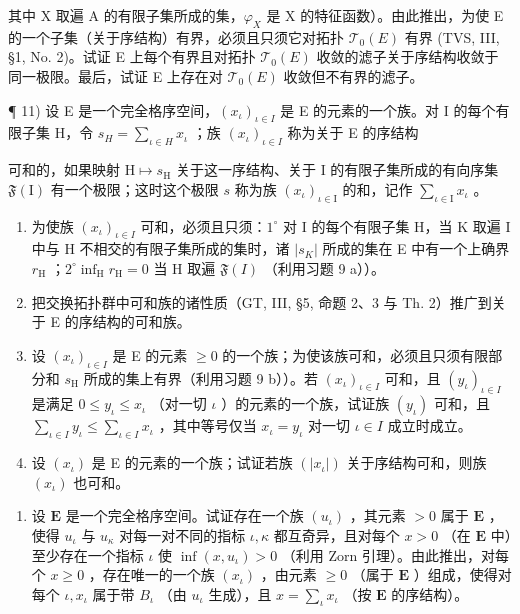 其中 X 取遍 A 的有限子集所成的集，\(\varphi_{X}\) 是 X 的特征函数）。由此推出，为使 E 的一个子集（关于序结构）有界，必须且只须它对拓扑 \(\mathcal{T}_{0}(E)\) 有界 (TVS, III, §1, No. 2)。试证 E 上每个有界且对拓扑 \(\mathcal{T}_{0}(E)\) 收敛的滤子关于序结构收敛于同一极限。最后，试证 E 上存在对 \(\mathcal{T}_{0}(E)\) 收敛但不有界的滤子。

¶ 11) 设 E 是一个完全格序空间，\((x_{\iota})_{\iota \in I}\) 是 E 的元素的一个族。对 I 的每个有限子集 H，令 \(s_{H} = \sum_{\iota \in H} x_{\iota}\) ；族 \((x_{\iota})_{\iota \in I}\) 称为关于 E 的序结构

可和的，如果映射 \(\mathrm{H} \mapsto s_{\mathrm{H}}\) 关于这一序结构、关于 I 的有限子集所成的有向序集 \(\mathfrak{F}(\mathrm{I})\) 有一个极限；这时这个极限 \(s\) 称为族 \((x_{\iota})_{\iota \in \mathrm{I}}\) 的和，记作 \(\sum_{\iota \in \mathrm{I}} x_{\iota}\) 。

\begin{enumerate}
\def\labelenumi{\alph{enumi})}
\item
  为使族 \((x_{\iota})_{\iota \in I}\) 可和，必须且只须：\(1^{\circ}\) 对 I 的每个有限子集 H，当 K 取遍 I 中与 H 不相交的有限子集所成的集时，诸 \(|s_{K}|\) 所成的集在 E 中有一个上确界 \(r_{\mathrm{H}}\) ；\(2^{\circ} \inf_{\mathrm{H}} r_{\mathrm{H}} = 0\) 当 H 取遍 \(\mathfrak{F}(I)\) （利用习题 9 a））。
\item
  把交换拓扑群中可和族的诸性质（GT, III, §5, 命题 2、3 与 Th. 2）推广到关于 E 的序结构的可和族。
\item
  设 \((x_{\iota})_{\iota \in I}\) 是 E 的元素 \(\geqslant 0\) 的一个族；为使该族可和，必须且只须有限部分和 \(s_{\mathrm{H}}\) 所成的集上有界（利用习题 9 b））。若 \((x_{\iota})_{\iota \in I}\) 可和，且 \((y_{\iota})_{\iota \in I}\) 是满足 \(0 \leqslant y_{\iota} \leqslant x_{\iota}\) （对一切 \(\iota\) ）的元素的一个族，试证族 \((y_{\iota})\) 可和，且 \(\sum_{\iota \in I} y_{\iota} \leqslant \sum_{\iota \in I} x_{\iota}\) ，其中等号仅当 \(x_{\iota} = y_{\iota}\) 对一切 \(\iota \in I\) 成立时成立。
\item
  设 \((x_{\iota})\) 是 E 的元素的一个族；试证若族 \((|x_{\iota}|)\) 关于序结构可和，则族 \((x_{\iota})\) 也可和。
\end{enumerate}

\begin{enumerate}
\def\labelenumi{\arabic{enumi})}
\setcounter{enumi}{11}
\tightlist
\item
  设 \(\mathbf{E}\) 是一个完全格序空间。试证存在一个族 \((u_{\iota})\) ，其元素 \(> 0\) 属于 \(\mathbf{E}\) ，使得 \(u_{\iota}\) 与 \(u_{\kappa}\) 对每一对不同的指标 \(\iota, \kappa\) 都互奇异，且对每个 \(x > 0\) （在 \(\mathbf{E}\) 中）至少存在一个指标 \(\iota\) 使 \(\inf(x, u_{\iota}) > 0\) （利用 Zorn 引理）。由此推出，对每个 \(x \geqslant 0\) ，存在唯一的一个族 \((x_{\iota})\) ，由元素 \(\geqslant 0\) （属于 \(\mathbf{E}\) ）组成，使得对每个 \(\iota, x_{\iota}\) 属于带 \(B_{\iota}\) （由 \(u_{\iota}\) 生成），且 \(x = \sum_{\iota} x_{\iota}\) （按 \(\mathbf{E}\) 的序结构）。
\end{enumerate}

